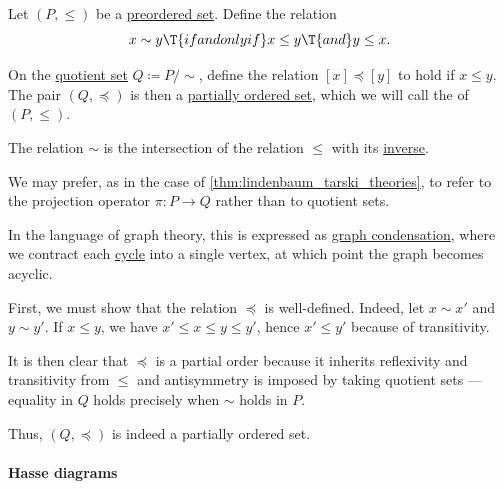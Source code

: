 \begin{definition}\label{def:antisymmetric_quotient}\mimprovised
  Let \( (P, \leq) \) be a \hyperref[def:preordered_set]{preordered set}. Define the relation
  \begin{equation}\label{eq:def:antisymmetric_quotient}
    x \sim y \T{if and only if} x \leq y \T{and} y \leq x.
  \end{equation}

  On the \hyperref[def:equivalence_relation/quotient]{quotient set} \( Q \coloneqq P / {\sim} \), define the relation \( [x] \preceq [y] \) to hold if \( x \leq y \). The pair \( (Q, \preceq) \) is then a \hyperref[def:partially_ordered_set]{partially ordered set}, which we will call the  of \( (P, \leq) \).
\end{definition}
\begin{comments}
  \item The relation \( \sim \) is the intersection of the relation \( \leq \) with its \hyperref[def:binary_relation/inverse]{inverse}.

  \item We may prefer, as in the case of \cref{thm:lindenbaum_tarski_theories}, to refer to the projection operator \( \pi: P \to Q \) rather than to quotient sets.

  \item In the language of graph theory, this is expressed as \hyperref[def:directed_graph_condensation]{graph condensation}, where we contract each \hyperref[def:graph_cycle]{cycle} into a single vertex, at which point the graph becomes acyclic.
\end{comments}
\begin{defproof}
  First, we must show that the relation \( \preceq \) is well-defined. Indeed, let \( x \sim x' \) and \( y \sim y' \). If \( x \leq y \), we have \( x' \leq x \leq y \leq y' \), hence \( x' \leq y' \) because of transitivity.

  It is then clear that \( \preceq \) is a partial order because it inherits reflexivity and transitivity from \( \leq \) and antisymmetry is imposed by taking quotient sets --- equality in \( Q \) holds precisely when \( {\sim} \) holds in \( P \).

  Thus, \( (Q, \preceq) \) is indeed a partially ordered set.
\end{defproof}

\paragraph{Hasse diagrams}

